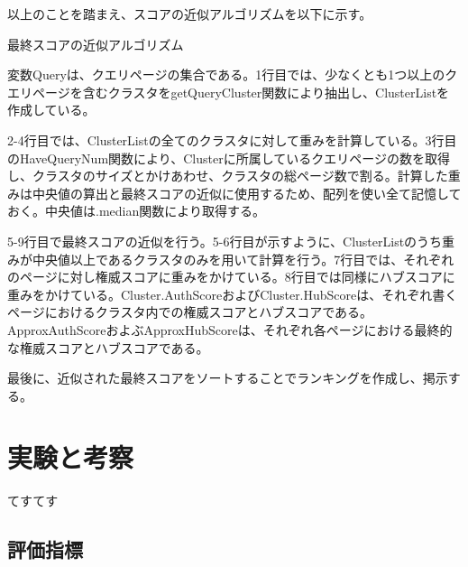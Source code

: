 \documentclass[a4paper,11pt]{jreport}
\begin{document}
\newpage

以上のことを踏まえ、スコアの近似アルゴリズムを以下に示す。

\begin{algorithm}
\caption{最終スコアの近似アルゴリズム}
\begin{algorithmic}[1]

\ENDFOR
{}
\ENDIF
\ENDFOR
\end{algorithmic}
\end{algorithm}

変数Queryは、クエリページの集合である。1行目では、少なくとも1つ以上のクエリページを含むクラスタをgetQueryCluster関数により抽出し、ClusterListを作成している。

2-4行目では、ClusterListの全てのクラスタに対して重みを計算している。3行目のHaveQueryNum関数により、Clusterに所属しているクエリページの数を取得し、クラスタのサイズとかけあわせ、クラスタの総ページ数で割る。計算した重みは中央値の算出と最終スコアの近似に使用するため、配列を使い全て記憶しておく。中央値は.median関数により取得する。

5-9行目で最終スコアの近似を行う。5-6行目が示すように、ClusterListのうち重みが中央値以上であるクラスタのみを用いて計算を行う。7行目では、それぞれのページに対し権威スコアに重みをかけている。8行目では同様にハブスコアに重みをかけている。Cluster.AuthScoreおよびCluster.HubScoreは、それぞれ書くページにおけるクラスタ内での権威スコアとハブスコアである。ApproxAuthScoreおよぶApproxHubScoreは、それぞれ各ページにおける最終的な権威スコアとハブスコアである。

最後に、近似された最終スコアをソートすることでランキングを作成し、掲示する。

\chapter{実験と考察}

てすてす

\section{評価指標}
\end{document}
